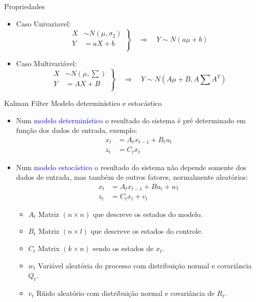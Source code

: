 Propriedades
\begin{itemize}
    \item Caso Univariavel:
    \begin{equation}
        \left.
        \begin{aligned}
                X & \sim N\left(\mu, \sigma_2\right)\\
                Y & = aX + b\\
        \end{aligned} \right\}
        \quad \Rightarrow \quad Y \sim N\left(a\mu+b\right)
    \end{equation}
    \item Caso Multivariável:
    \begin{equation}
        \left.
        \begin{aligned}
                X & \sim N\left(\mu, \textstyle\sum\right)\\
                Y & = AX + B\\
        \end{aligned} \right\}
        \quad \Rightarrow \quad Y \sim N\left( A\mu+B, A\textstyle\sum A^T \right)
    \end{equation}
\end{itemize}


Kalman Filter
Modelo determinístico e estocástico 

\begin{itemize}
    \item Num \textcolor{blue}{modelo determinístico} o resultado do sistema é pré determinado em função dos dados de entrada, exemplo:
    \begin{align*} 
        x_t &= A_t x_{t-1} + B_t u_t\\ 
        z_t &= C_t x_t
    \end{align*}
    \item Num \textcolor{blue}{modelo estocástico} o resultado do sistema não depende somente dos dados de entrada, mas também de outros fatores, normalmente
    aleatórios:
    \begin{align} 
        x_t &= A_t x_{t-1} + B u_t +  w_t\\ 
        z_t &= C_t x_t + v_t
    \end{align}
    \begin{itemize}
        \item $A_t$ Matriz $(n \times n)$ que descreve os estados do modelo.
        \item $B_t$ Matriz $(n \times l)$ que descreve os estados do controle.
        \item $C_t$ Matrix $(k\times n)$ sendo os estados de $x_t$.
        \item $ w_t$ Variável aleatória do processo com distribuição normal e covariância $Q_t$.
        \item $v_t$ Rúido aleatório com distribuição normal e covariância de $R_t$.
    \end{itemize}
\end{itemize}


